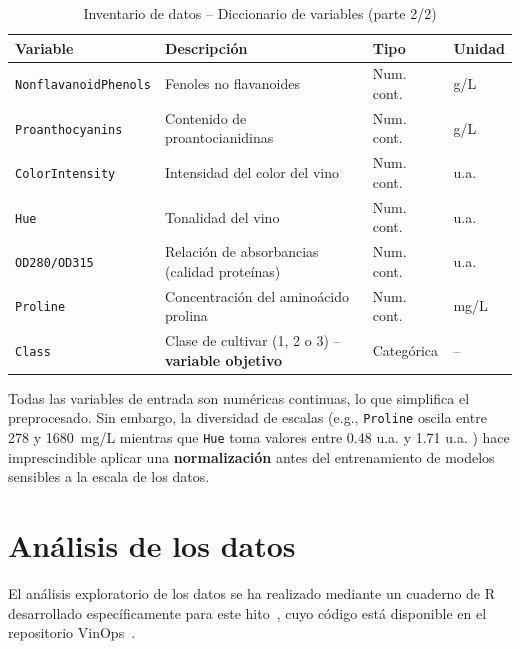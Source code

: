 \begin{table}[H]
    \centering
    \caption{Inventario de datos -- Diccionario de variables (parte 2/2)}
    \small
    \begin{tabular}{p{4cm} p{6.5cm} p{1.8cm} p{1.5cm}}
        \toprule
        \textbf{Variable} & \textbf{Descripci\'on} & \textbf{Tipo} & \textbf{Unidad} \\
        \midrule
        \texttt{NonflavanoidPhenols}
            & Fenoles no flavanoides
            & Num. cont. & g/L \\[3pt]
        \texttt{Proanthocyanins}
            & Contenido de proantocianidinas
            & Num. cont. & g/L \\[3pt]
        \texttt{ColorIntensity}
            & Intensidad del color del vino
            & Num. cont. & u.a. \\[3pt]
        \texttt{Hue}
            & Tonalidad del vino
            & Num. cont. & u.a. \\[3pt]
        \texttt{OD280/OD315}
            & Relaci\'on de absorbancias (calidad prote\'inas)
            & Num. cont. & u.a. \\[3pt]
        \texttt{Proline}
            & Concentraci\'on del amino\'acido prolina
            & Num. cont. & mg/L \\[3pt]
        \midrule
        \texttt{Class}
            & Clase de cultivar (1, 2 o 3) --
              \textbf{variable objetivo}
            & Categ\'orica & -- \\
        \bottomrule
    \end{tabular}
    \label{tab:diccionario2}
\end{table}

Todas las variables de entrada son num\'ericas continuas, lo que simplifica
el preprocesado. Sin embargo, la diversidad de escalas (e.g., \texttt{Proline} oscila
entre 278 y 1680~mg/L mientras que \texttt{Hue} toma valores entre 0.48 u.a. y 1.71 u.a. ) hace
imprescindible aplicar una \textbf{normalizaci\'on} antes del
entrenamiento de modelos sensibles a la escala de los datos.

\section{An\'alisis de los datos}

El análisis exploratorio de los datos se ha realizado mediante un cuaderno
de R desarrollado específicamente para este hito~\cite{eda_r_script}, cuyo
código está disponible en el repositorio VinOps~\cite{vinops_repo}.

